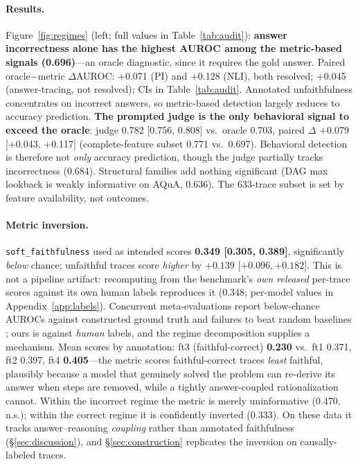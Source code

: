\documentclass[11pt]{article}
\begin{document}
\paragraph{Results.} Figure~\ref{fig:regimes} (left; full values in Table~\ref{tab:audit}): \textbf{answer incorrectness alone has the highest AUROC among the metric-based signals (0.696)}---an oracle diagnostic, since it requires the gold answer. Paired oracle$-$metric $\Delta$AUROC: $+$0.071 (PI) and $+$0.128 (NLI), both resolved; $+$0.045 (answer-tracing, not resolved); CIs in Table~\ref{tab:audit}. Annotated unfaithfulness concentrates on incorrect answers, so metric-based detection largely reduces to accuracy prediction. \textbf{The prompted judge is the only behavioral signal to exceed the oracle}: judge 0.782 [0.756, 0.808] vs.\ oracle 0.703, paired $\Delta$ $+$0.079 [$+$0.043, $+$0.117] (complete-feature subset 0.771 vs.\ 0.697). Behavioral detection is therefore not \emph{only} accuracy prediction, though the judge partially tracks incorrectness (0.684). Structural families add nothing significant (DAG max lookback is weakly informative on AQuA, 0.636). The 633-trace subset is set by feature availability, not outcomes.

\paragraph{Metric inversion.} \texttt{soft\_faithfulness} used as intended scores \textbf{0.349 [0.305, 0.389]}, significantly \emph{below} chance; unfaithful traces score \emph{higher} by $+0.139$ [$+0.096, +0.182$]. This is not a pipeline artifact: recomputing from the benchmark's \emph{own released} per-trace scores against its own human labels reproduces it (0.348; per-model values in Appendix~\ref{app:labels}). Concurrent meta-evaluations report below-chance AUROCs against constructed ground truth \citep{gurarieh2026bonafide} and failures to beat random baselines \citep{zaman2025causal}; ours is against \emph{human} labels, and the regime decomposition supplies a mechanism. Mean scores by annotation: ft3 (faithful-correct) \textbf{0.230} vs.\ ft1 0.371, ft2 0.397, ft4 \textbf{0.405}---the metric scores faithful-correct traces \emph{least} faithful, plausibly because a model that genuinely solved the problem can re-derive its answer when steps are removed, while a tightly answer-coupled rationalization cannot. Within the incorrect regime the metric is merely uninformative (0.470, n.s.); within the correct regime it is confidently inverted (0.333). On these data it tracks answer--reasoning \emph{coupling} rather than annotated faithfulness (\S\ref{sec:discussion}), and \S\ref{sec:construction} replicates the inversion on causally-labeled traces.
\end{document}
